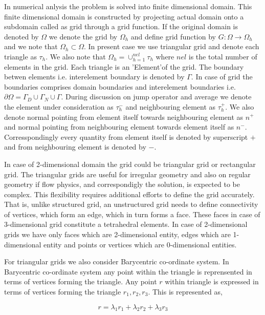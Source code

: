 \documentclass[a4paper,10pt]{book}
\begin{document}
In numerical anlysis the problem is solved into finite dimensional domain. This finite dimensional domain is constructed by projecting actual domain onto a subdomain called as grid through a grid function.
If the original domain is denoted by $\Omega$ we denote the grid by $\Omega_h$ and define grid function by $G:\Omega \rightarrow \Omega_h$ and we note that $\Omega_h \subset \Omega$. In present case we use triangular grid and denote each triangle as $\tau_h$. We also note that $\Omega_h = \cup_{h=1}^{nel} \tau_h$ where $nel$ is the total number of elements in the grid. Each triangle is an 'Element'of the grid. The boundary betwen elements i.e. interelement boundary is denoted by $\Gamma$. In case of grid the boundaries comprises domain boundaries and interelement boundaries i.e. $\partial \Omega = \Gamma_D \cup \Gamma_N \cup \Gamma$. During discussion on jump operator and average we denote the element under consideration as $\tau_{h}^-$ and neighbouring element as $\tau_{h}^+$. We also denote normal pointing from element itself towards neighbouring element as $n^+$ and normal pointing from neighbouring element towards element itself as $n^-$. Corresspondingly every quantity from element itself is denoted by superscript $+$ and from neighbouring element is denoted by $-$.

In case of 2-dimensional domain the grid could be triangular grid or rectangular grid. The triangular grids are useful for irregular geometry and also on regular geometry if flow physics, and correspondigly the solution, is expected to be complex. This flexibility requires additional efforts to define the grid accurately. That is, unlike structured grid, an unstructured grid needs to define connectivity of vertices, which form an edge, which in turn forms a face. These faces in case of 3-dimensional grid constitute a tetrahedral elements. In case of 2-dimensional grids we have only faces which are 2-dimensional entity, edges which are 1-dimensional entity and points or vertices which are 0-dimensional entities.

For triangular grids we also consider Barycentric co-ordinate system. In Barycentric co-ordinate system any point within the triangle is reprensented in terms of vertices forming the triangle. Any point $r$ within triangle is expressed in terms of vertices forming the triangle $r_1,r_2,r_3$. This is represented as,

\begin{equation}\label{barycentric point}
r = \lambda_1 r_1 + \lambda_2 r_2 + \lambda_3 r_3
\end{equation}
\end{document}
